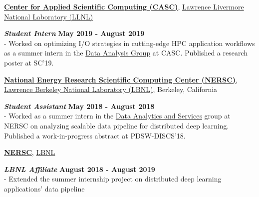 \documentclass[margin,line]{res}
\begin{document}
\begin{resume}
\vspace{-.3cm}
{\bf \href{https://computing.llnl.gov/casc}{Center for Applied Scientific Computing (CASC)}}, \href{http://www.llnl.gov/}{Lawrence Livermore National Laboratory (LLNL)}

\vspace{-.4cm}
\textbf{{\em Student Intern}} \hfill {\bf May 2019 - August 2019}\\
- Worked on optimizing I/O strategies in cutting-edge HPC application workflows as a summer intern in the \href{https://computing.llnl.gov/casc/data-analysis-group}{Data Analysis Group} at CASC. Published a research poster at SC'19.

\vspace{-.3cm}
{\bf \href{http://www.nersc.gov/}{National Energy Research Scientific Computing Center (NERSC)}}, \href{http://www.lbl.gov/}{Lawrence Berkeley National Laboratory (LBNL)}, Berkeley, California

\vspace{-.4cm}
\textbf{{\em Student Assistant}} \hfill {\bf May 2018 - August 2018}\\
- Worked as a summer intern in the \href{http://www.nersc.gov/users/data-analytics/}{Data Analytics and Services} group at NERSC on analyzing scalable data pipeline for distributed deep learning. Published a work-in-progress abstract at PDSW-DISCS'18.

\vspace{-.3cm}
{\bf \href{http://www.nersc.gov/}{NERSC}}, \href{http://www.lbl.gov/}{LBNL}

\vspace{-.4cm}
\textbf{{\em LBNL Affiliate}} \hfill {\bf August 2018 - August 2019}\\
- Extended the summer internship project on distributed deep learning applications' data pipeline

\vspace*{-.1in}


\end{resume}
\end{document}
